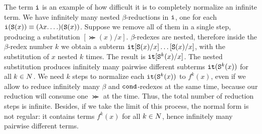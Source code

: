 The term ${\tt i}$ is an example of how difficult it is to completely normalize
an infinite term. We have infinitely many nested $\beta$-reductions in
${\tt i}$, one for each ${\tt i}({\tt S} (x)) \equiv (\lambda x.\ldots)({\tt S} (x))$. 
Suppose we remove all of them in a single step, producing a substitution
$[\Succ (x)/x]$. $\beta$-redexes are nested, therefore 
inside the $\beta$-redex number $k$ we obtain a subterm ${\tt it}[{\tt S} (x)/x]
\ldots[{\tt S} (x)/x]$, with the substitution of $x$ nested $k$ times. 
The result is ${\tt it}[{\tt S} ^k(x)/x]$.
The nested substitution produces infinitely many pairwise different subterms 
${\tt it}({\tt S} ^k(x))$ for all $k \in {N}$. 
We need $k$ steps to normalize each ${\tt it}({\tt S} ^k(x))$ to $f^k(x)$, 
even if we allow to reduce infinitely many 
$\beta$ and ${\tt cond}$-redexes at the same time, because our reduction will consume one 
$\Succ$ at the time. Thus, the total number of reduction steps is infinite. 
Besides, if we take the limit of this process, the normal form is not regular: it contains terms 
$f^k(x)$ for all $k \in {N}$, hence infinitely many pairwise different terms. 




